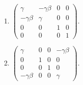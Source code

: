 \documentclass[a4paper,11pt]{article}
\begin{document}
\begin{enumerate}[itemsep=1em]
    \item $\displaystyle
    \begin{pmatrix}
        \gamma & -\gamma\beta & 0 & 0 \\
        -\gamma\beta & \gamma & 0 & 0 \\
        0 & 0 & 1 & 0 \\
        0 & 0 & 0 & 1
    \end{pmatrix}$.
    \item $\displaystyle
    \begin{pmatrix}
        \gamma & 0 & 0 & -\gamma\beta \\
        0 & 1 & 0 & 0 \\
        0 & 0 & 1 & 0 \\
        -\gamma\beta & 0 & 0 & \gamma
    \end{pmatrix}$.
\end{enumerate}
\end{document}
